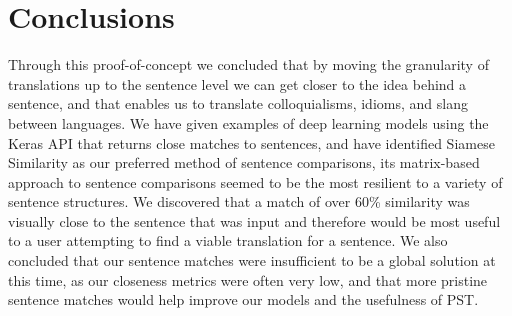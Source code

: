 \documentclass[runningheads]{llncs}
\begin{document}
	\section{Conclusions}
	Through this proof-of-concept we concluded that by moving the granularity of translations up to the sentence level we can get closer to the idea behind a sentence, and that enables us to translate colloquialisms, idioms, and slang between languages. We have given examples of deep learning models using the Keras API that returns close matches to sentences, and have identified Siamese Similarity as our preferred method of sentence comparisons, its matrix-based approach to sentence comparisons seemed to be the most resilient to a variety of sentence structures. We discovered that a match of over 60\% similarity was visually close to the sentence that was input and therefore would be most useful to a user attempting to find a viable translation for a sentence. We also concluded that our sentence matches were insufficient to be a global solution at this time, as our closeness metrics were often very low, and that more pristine sentence matches would help improve our models and the usefulness of PST.
\end{document}
